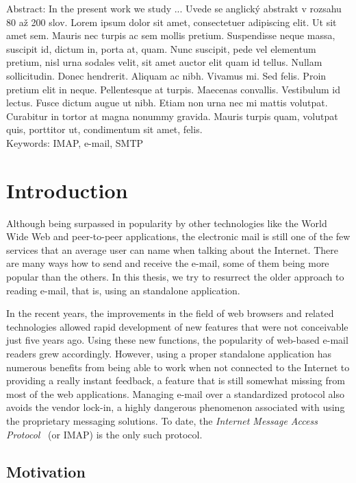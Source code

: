 \documentclass[12pt,notitlepage]{report}
\begin{document}
\noindent Abstract: In the present work we study ... Uvede se anglický abstrakt
v rozsahu 80 až 200 slov. Lorem ipsum dolor sit amet, consectetuer adipiscing
elit. Ut sit amet sem. Mauris nec turpis ac sem mollis pretium. Suspendisse
neque massa, suscipit id, dictum in, porta at, quam. Nunc suscipit, pede vel
elementum pretium, nisl urna sodales velit, sit amet auctor elit quam id tellus.
Nullam sollicitudin. Donec hendrerit. Aliquam ac nibh. Vivamus mi. Sed felis.
Proin pretium elit in neque. Pellentesque at turpis. Maecenas convallis.
Vestibulum id lectus. Fusce dictum augue ut nibh. Etiam non urna nec mi mattis
volutpat. Curabitur in tortor at magna nonummy gravida. Mauris turpis quam,
volutpat quis, porttitor ut, condimentum sit amet, felis. \\

\noindent Keywords: IMAP, e-mail, SMTP

\newpage

\chapter{Introduction}

Although being surpassed in popularity by other technologies like the World Wide
Web and peer-to-peer applications, the electronic mail is still one of the few
services that an average user can name when talking about the Internet.  There are
many ways how to send and receive the e-mail, some of them being more popular
than the others.  In this thesis, we try to resurrect the older approach to
reading e-mail, that is, using an standalone application.

In the recent years, the improvements in the field of web browsers and related
technologies allowed rapid development of new features that were not conceivable
just five years ago.  Using these new functions, the popularity of web-based
e-mail readers grew accordingly.  However, using a proper standalone application
has numerous benefits from being able to work when not connected to the Internet
to providing a really instant feedback, a feature that is still somewhat missing
from most of the web applications.  Managing e-mail over a standardized protocol
also avoids the vendor lock-in, a highly dangerous phenomenon associated with
using the proprietary messaging solutions.  To date, the {\em Internet Message
Access Protocol}~\cite{rfc-imap} (or IMAP) is the only such protocol.

\section{Motivation}
\end{document}
